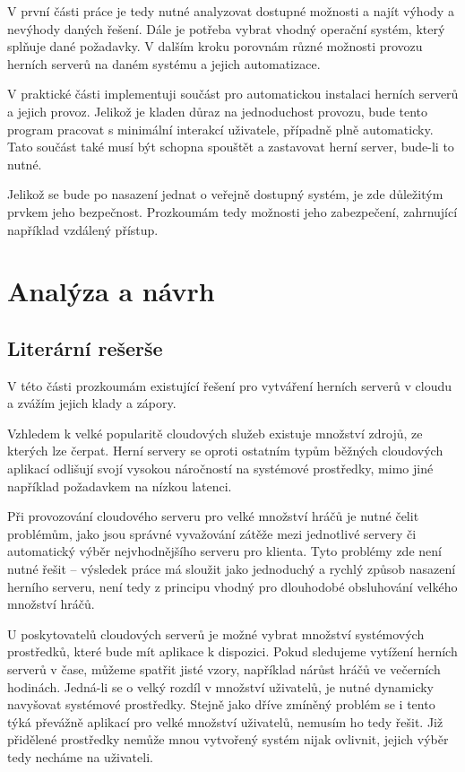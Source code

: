 \documentclass[thesis=B,czech]{FITthesis}[2019/12/23]
\begin{document}
V první části práce je tedy nutné analyzovat dostupné možnosti a najít výhody a nevýhody daných řešení. Dále je potřeba vybrat
vhodný operační systém, který splňuje dané požadavky. V dalším kroku porovnám různé možnosti provozu herních serverů
na daném systému a jejich automatizace.

V praktické části implementuji součást pro automatickou instalaci herních serverů a jejich provoz. Jelikož je kladen důraz
na jednoduchost provozu, bude tento program pracovat s minimální interakcí uživatele, případně plně automaticky.
Tato součást také musí být schopna spouštět a zastavovat herní server, bude-li to nutné.

Jelikož se bude po nasazení jednat o veřejně dostupný systém, je zde důležitým prvkem jeho bezpečnost. Prozkoumám tedy možnosti
jeho zabezpečení, zahrnující například vzdálený přístup.

\chapter[Analýza]{Analýza a návrh}


\section{Literární rešerše}

V této části prozkoumám existující řešení pro vytváření herních serverů v cloudu a zvážím jejich klady a zápory.

Vzhledem k velké popularitě cloudových služeb existuje množství zdrojů, ze kterých lze čerpat.
Herní servery se oproti ostatním typům běžných cloudových aplikací odlišují svojí vysokou náročností
na systémové prostředky, mimo jiné například požadavkem na nízkou latenci.

Při provozování cloudového serveru pro velké množství hráčů\cite{building_cloud_mog_server} je nutné čelit problémům,
jako jsou správné vyvažování zátěže mezi jednotlivé servery či automatický výběr nejvhodnějšího serveru
pro klienta. Tyto problémy zde není nutné řešit -- výsledek práce má sloužit jako jednoduchý a rychlý
způsob nasazení herního serveru, není tedy z principu vhodný pro dlouhodobé obsluhování velkého množství hráčů.

U poskytovatelů cloudových serverů je možné vybrat množství systémových prostředků, které bude mít aplikace k dispozici.
Pokud sledujeme vytížení herních serverů v čase, můžeme spatřit jisté vzory, například nárůst hráčů ve večerních hodinách.
Jedná-li se o velký rozdíl v množství uživatelů, je nutné dynamicky navyšovat systémové prostředky\cite{efficient_resources}.
Stejně jako dříve zmíněný problém se i tento týká převážně aplikací pro velké množství uživatelů, nemusím ho tedy řešit.
Již přidělené prostředky nemůže mnou vytvořený systém nijak ovlivnit, jejich výběr tedy necháme na uživateli.
\end{document}
